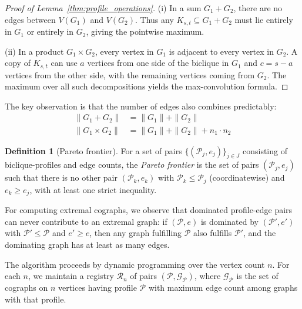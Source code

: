 \documentclass{article}
\theoremstyle{definition}
\theoremstyle{definition}
\theoremstyle{definition}
\theoremstyle{definition}
\theoremstyle{definition}
\newtheorem{Definition}{Definition}
\theoremstyle{definition}
\theoremstyle{definition}
\theoremstyle{definition}
\theoremstyle{definition}
\theoremstyle{definition}
\newenvironment{proofref}[2]{%
  \begin{proof}[Proof of #1~\ref{#2}]%
}{%
  \end{proof}%
}
\begin{document}
\begin{proofref}{Lemma}{thm:profile_operations}
    (i) In a sum $G_1 + G_2$, there are no edges between $V(G_1)$ and $V(G_2)$. Thus any $K_{s,t} \subseteq G_1 + G_2$ must lie entirely in $G_1$ or entirely in $G_2$, giving the pointwise maximum.

    (ii) In a product $G_1 \times G_2$, every vertex in $G_1$ is adjacent to every vertex in $G_2$. A copy of $K_{s,t}$ can use $a$ vertices from one side of the biclique in $G_1$ and $c = s - a$ vertices from the other side, with the remaining vertices coming from $G_2$. The maximum over all such decompositions yields the max-convolution formula.
\end{proofref}

The key observation is that the number of edges also combines predictably:
\begin{align}
    \|G_1 + G_2\| &= \|G_1\| + \|G_2\| \label{eq:edges_sum} \\
    \|G_1 \times G_2\| &= \|G_1\| + \|G_2\| + n_1 \cdot n_2 \label{eq:edges_product}
\end{align}

\begin{Definition}[Pareto frontier] \label{def:pareto_frontier}
    For a set of pairs $\{(\mathscr{P}_j, e_j)\}_{j \in J}$ consisting of biclique-profiles and edge counts, the \emph{Pareto frontier} is the set of pairs $(\mathscr{P}_j, e_j)$ such that there is no other pair $(\mathscr{P}_k, e_k)$ with $\mathscr{P}_k \leq \mathscr{P}_j$ (coordinatewise) and $e_k \geq e_j$, with at least one strict inequality.
\end{Definition}

For computing extremal cographs, we observe that dominated profile-edge pairs can never contribute to an extremal graph: if $(\mathscr{P}, e)$ is dominated by $(\mathscr{P}', e')$ with $\mathscr{P}' \leq \mathscr{P}$ and $e' \geq e$, then any graph fulfilling $\mathscr{P}$ also fulfills $\mathscr{P}'$, and the dominating graph has at least as many edges.

The algorithm proceeds by dynamic programming over the vertex count $n$. For each $n$, we maintain a registry $\mathcal{R}_n$ of pairs $(\mathscr{P}, \mathcal{G}_{\mathscr{P}})$, where $\mathcal{G}_{\mathscr{P}}$ is the set of cographs on $n$ vertices having profile $\mathscr{P}$ with maximum edge count among graphs with that profile.
\end{document}
